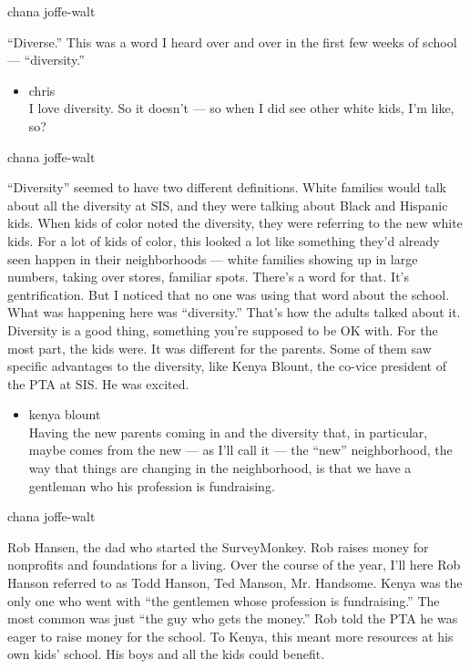 chana joffe-walt

``Diverse.'' This was a word I heard over and over in the first few
weeks of school --- ``diversity.''

\begin{itemize}
\tightlist
\item
  chris\\
  I love diversity. So it doesn't --- so when I did see other white
  kids, I'm like, so?
\end{itemize}

chana joffe-walt

``Diversity'' seemed to have two different definitions. White families
would talk about all the diversity at SIS, and they were talking about
Black and Hispanic kids. When kids of color noted the diversity, they
were referring to the new white kids. For a lot of kids of color, this
looked a lot like something they'd already seen happen in their
neighborhoods --- white families showing up in large numbers, taking
over stores, familiar spots. There's a word for that. It's
gentrification. But I noticed that no one was using that word about the
school. What was happening here was ``diversity.'' That's how the adults
talked about it. Diversity is a good thing, something you're supposed to
be OK with. For the most part, the kids were. It was different for the
parents. Some of them saw specific advantages to the diversity, like
Kenya Blount, the co-vice president of the PTA at SIS. He was excited.

\begin{itemize}
\tightlist
\item
  kenya blount\\
  Having the new parents coming in and the diversity that, in
  particular, maybe comes from the new --- as I'll call it --- the
  ``new'' neighborhood, the way that things are changing in the
  neighborhood, is that we have a gentleman who his profession is
  fundraising.
\end{itemize}

chana joffe-walt

Rob Hansen, the dad who started the SurveyMonkey. Rob raises money for
nonprofits and foundations for a living. Over the course of the year,
I'll here Rob Hanson referred to as Todd Hanson, Ted Manson, Mr.
Handsome. Kenya was the only one who went with ``the gentlemen whose
profession is fundraising.'' The most common was just ``the guy who gets
the money.'' Rob told the PTA he was eager to raise money for the
school. To Kenya, this meant more resources at his own kids' school. His
boys and all the kids could benefit.

